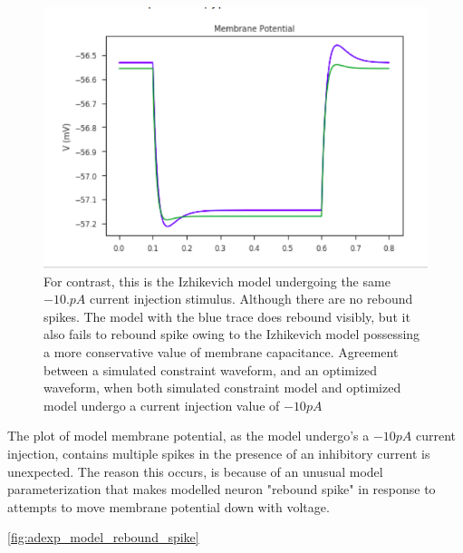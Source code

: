 \begin{figure}
    \begin{center}
    \includegraphics[scale=0.65]{figures/passive_model_agreement}
    \caption[Izhikevich model undergoing a negative square stimulus]{For contrast, this is the Izhikevich model undergoing the same $-10.pA$ current injection stimulus. Although there are no rebound spikes. The model with the blue trace does rebound visibly, but it also fails to rebound spike owing to the Izhikevich model possessing a more conservative value of membrane capacitance. Agreement between a simulated constraint waveform, and an optimized waveform, when both simulated constraint model and optimized model undergo a current injection value of $-10pA$}
    \end{center}
    \label{fig:my_label}
\end{figure}

The plot of model membrane potential, as the model undergo's a $-10pA$ current injection, contains multiple spikes in the presence of an inhibitory current is unexpected. The reason this occurs, is because of an unusual model parameterization that makes modelled neuron "rebound spike" in response to attempts to move membrane potential down with voltage.



\ref{fig:adexp_model_rebound_spike}

